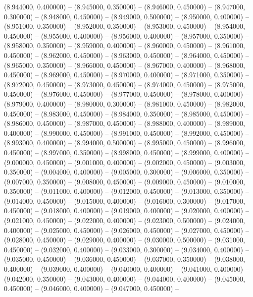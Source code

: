 (8.944000, 0.400000) -- 
(8.945000, 0.350000) -- 
(8.946000, 0.450000) -- 
(8.947000, 0.300000) -- 
(8.948000, 0.450000) -- 
(8.949000, 0.500000) -- 
(8.950000, 0.400000) -- 
(8.951000, 0.350000) -- 
(8.952000, 0.350000) -- 
(8.953000, 0.450000) -- 
(8.954000, 0.450000) -- 
(8.955000, 0.400000) -- 
(8.956000, 0.400000) -- 
(8.957000, 0.350000) -- 
(8.958000, 0.350000) -- 
(8.959000, 0.400000) -- 
(8.960000, 0.450000) -- 
(8.961000, 0.450000) -- 
(8.962000, 0.450000) -- 
(8.963000, 0.450000) -- 
(8.964000, 0.450000) -- 
(8.965000, 0.350000) -- 
(8.966000, 0.450000) -- 
(8.967000, 0.400000) -- 
(8.968000, 0.450000) -- 
(8.969000, 0.450000) -- 
(8.970000, 0.400000) -- 
(8.971000, 0.350000) -- 
(8.972000, 0.450000) -- 
(8.973000, 0.450000) -- 
(8.974000, 0.450000) -- 
(8.975000, 0.450000) -- 
(8.976000, 0.450000) -- 
(8.977000, 0.450000) -- 
(8.978000, 0.400000) -- 
(8.979000, 0.400000) -- 
(8.980000, 0.300000) -- 
(8.981000, 0.450000) -- 
(8.982000, 0.450000) -- 
(8.983000, 0.450000) -- 
(8.984000, 0.350000) -- 
(8.985000, 0.450000) -- 
(8.986000, 0.450000) -- 
(8.987000, 0.450000) -- 
(8.988000, 0.400000) -- 
(8.989000, 0.400000) -- 
(8.990000, 0.450000) -- 
(8.991000, 0.450000) -- 
(8.992000, 0.450000) -- 
(8.993000, 0.400000) -- 
(8.994000, 0.500000) -- 
(8.995000, 0.450000) -- 
(8.996000, 0.450000) -- 
(8.997000, 0.350000) -- 
(8.998000, 0.450000) -- 
(8.999000, 0.400000) -- 
(9.000000, 0.450000) -- 
(9.001000, 0.400000) -- 
(9.002000, 0.450000) -- 
(9.003000, 0.350000) -- 
(9.004000, 0.400000) -- 
(9.005000, 0.300000) -- 
(9.006000, 0.350000) -- 
(9.007000, 0.350000) -- 
(9.008000, 0.450000) -- 
(9.009000, 0.450000) -- 
(9.010000, 0.350000) -- 
(9.011000, 0.400000) -- 
(9.012000, 0.450000) -- 
(9.013000, 0.350000) -- 
(9.014000, 0.450000) -- 
(9.015000, 0.400000) -- 
(9.016000, 0.300000) -- 
(9.017000, 0.450000) -- 
(9.018000, 0.400000) -- 
(9.019000, 0.400000) -- 
(9.020000, 0.400000) -- 
(9.021000, 0.450000) -- 
(9.022000, 0.400000) -- 
(9.023000, 0.500000) -- 
(9.024000, 0.400000) -- 
(9.025000, 0.450000) -- 
(9.026000, 0.450000) -- 
(9.027000, 0.450000) -- 
(9.028000, 0.450000) -- 
(9.029000, 0.400000) -- 
(9.030000, 0.500000) -- 
(9.031000, 0.450000) -- 
(9.032000, 0.400000) -- 
(9.033000, 0.300000) -- 
(9.034000, 0.400000) -- 
(9.035000, 0.450000) -- 
(9.036000, 0.450000) -- 
(9.037000, 0.350000) -- 
(9.038000, 0.400000) -- 
(9.039000, 0.400000) -- 
(9.040000, 0.400000) -- 
(9.041000, 0.400000) -- 
(9.042000, 0.350000) -- 
(9.043000, 0.400000) -- 
(9.044000, 0.400000) -- 
(9.045000, 0.450000) -- 
(9.046000, 0.400000) -- 
(9.047000, 0.450000) -- 
